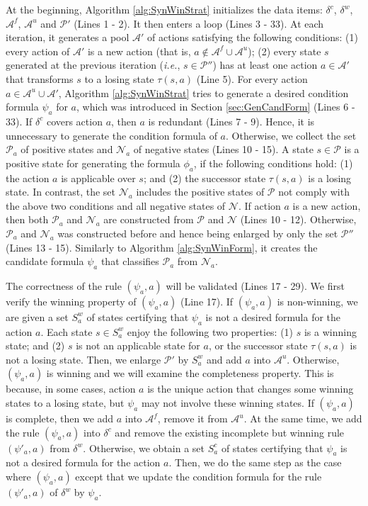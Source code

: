 \documentclass[review]{elsarticle}
\newcommand{\positiveSet}{\mathcal{P}}
\newcommand{\negativeSet}{\mathcal{N}}
\newcommand{\act}{\mathcal{A}}
\newcommand{\suc}{\tau}
\newcommand\ie{{\it i.e.}}
\begin{document}
At the beginning, Algorithm \ref{alg:SynWinStrat} initializes the data items: $\delta^c$, $\delta^w$, $\act^f$, $\act^u$ and $\positiveSet'$ (Lines 1 - 2).
It then enters a loop (Lines 3 - 33).
At each iteration, it generates a pool $\act'$ of actions satisfying the following conditions: (1) every action of $\act'$ is a new action (that is, $a \notin \act^f \cup \act^u$); (2)  every state $s$ generated at the previous iteration (\ie, $s \in \positiveSet''$) has at least one action $a \in \act'$ that transforms $s$ to a losing state $\suc(s, a)$ (Line 5).
For every action $a \in \act^u \cup \act'$, Algorithm \ref{alg:SynWinStrat} tries to generate a desired condition formula $\psi_a$ for $a$, which was introduced in Section \ref{sec:GenCandForm} (Lines 6 - 33).
If $\delta^c$ covers action $a$, then $a$ is redundant (Lines 7 - 9).
Hence, it is unnecessary to generate the condition formula of $a$.
Otherwise, we collect the set $\positiveSet_a$ of positive states and $\negativeSet_a$ of negative states (Lines 10 - 15).
A state $s \in \positiveSet$ is a positive state for generating the formula $\phi_a$, if the following conditions hold: (1) the action $a$ is applicable over $s$; and (2) the successor state $\suc(s, a)$ is a losing state.
In contrast, the set $\negativeSet_a$ includes the positive states of $\positiveSet$ not comply with the above two conditions and all negative states of $\negativeSet$.
If action $a$ is a new action, then both $\positiveSet_a$ and $\negativeSet_a$ are constructed from $\positiveSet$ and $\negativeSet$ (Lines 10 - 12).
Otherwise, $\positiveSet_a$ and $\negativeSet_a$ was constructed before and hence being enlarged by only the set $\positiveSet''$ (Lines 13 - 15).
Similarly to Algorithm \ref{alg:SynWinForm}, it creates the candidate formula $\psi_a$ that classifies $\positiveSet_a$ from $\negativeSet_a$.

The correctness of the rule $(\psi_a, a)$ will be validated (Lines 17 - 29).
We first verify the winning property of $(\psi_a, a)$ (Line 17).
If $(\psi_a, a)$ is non-winning, we are given a set $S^w_a$ of states certifying that $\psi_a$ is not a desired formula for the action $a$.
Each state $s \in S^w_a$ enjoy the following two properties: (1) $s$ is a winning state; and (2) $s$ is not an applicable state for $a$, or the successor state $\suc(s, a)$ is not a losing state.
Then, we enlarge $\positiveSet'$ by $S^w_a$ and add $a$ into $\act^u$.
Otherwise, $(\psi_a, a)$ is winning and we will examine the completeness property.
This is because, in some cases, action $a$ is the unique action that changes some winning states to a losing state, but $\psi_a$ may not involve these winning states.
If $(\psi_a, a)$ is complete, then we add $a$ into $\act^f$, remove it from $\act^u$.
At the same time, we add the rule $(\psi_a, a)$ into $\delta^c$ and remove the existing incomplete but winning rule $(\psi'_a, a)$ from $\delta^w$.
Otherwise, we obtain a set $S^c_a$ of states certifying that $\psi_a$ is not a desired formula for the action $a$.
Then, we do the same step as the case where $(\psi_a, a)$ except that we update the condition formula for the rule $(\psi'_a, a)$ of $\delta^w$ by $\psi_a$.
\end{document}

